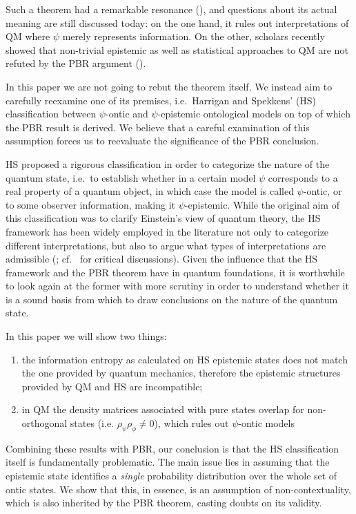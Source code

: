 \documentclass[twocolumn,prl,floatfix,superscriptaddress]{revtex4-2}
\begin{document}
Such a theorem had a remarkable resonance (\cite{Leifer:2014, Leifer:2014b, Renner:2012, Colbeck:2017, Hardy:2013, Maroney:2014, Patra:2013, Mansfield:2016, Schlosshauer:2012, Schlosshauer:2013, Schlosshauer:2014, Aaronson:2013}), and questions about its actual meaning are still discussed today: on the one hand, it rules out interpretations of QM where $\psi$ merely represents information. On the other, scholars recently showed that non-trivial epistemic as well as statistical approaches to QM are not refuted by the PBR argument (\cite{Ben:2017, Rizzi:2018, Oldofredi:2021, DeBrota:2019}).
	
In this paper we are not going to rebut the theorem itself. We instead aim to carefully reexamine one of its premises, i.e.\ Harrigan and Spekkens' (HS) classification between $\psi$-ontic and $\psi$-epistemic ontological models  \cite{Harrigan:2010} on top of which the PBR result is derived. We believe that a careful examination of this assumption forces us to reevaluate the significance of the PBR conclusion. 
		
HS proposed a rigorous classification in order to categorize the nature of the quantum state, i.e.\ to establish whether in a certain model $\psi$ corresponds to a real property of a quantum object, in which case the model is called $\psi$-ontic, or to some observer information, making it $\psi$-epistemic. While the original aim of this classification was to clarify Einstein's view of quantum theory, the HS framework has been widely employed in the literature not only to categorize different interpretations, but also to argue what types of interpretations are admissible (\cite{Leifer:2013, Leifer:2017, Branciard:2014, Hermens:2021, Wood:2015, Ringbauer:2015, Mazurek:2016, Bartlett:2012}; cf.\ \cite{Oldofredi:2020b, Lewis:2012, Ladyman:2021} for critical discussions). Given the influence that the HS framework and the PBR theorem have in quantum foundations, it is worthwhile to look again at the former with more scrutiny in order to understand whether it is a sound basis from which to draw conclusions on the nature of the quantum state.

In this paper we will show two things:
\begin{enumerate}
	\item the information entropy as calculated on HS epistemic states does not match the one provided by quantum mechanics, therefore the epistemic structures provided by QM and HS are incompatible;
	\item in QM the density matrices associated with pure states overlap for non-orthogonal states (i.e. $\rho_\psi \rho_\phi \neq 0$), which rules out $\psi$-ontic models
\end{enumerate}
Combining these results with PBR, our conclusion is that the HS classification itself is fundamentally problematic. The main issue lies in assuming that the epistemic state identifies a \emph{single} probability distribution over the whole set of ontic states. We show that this, in essence, is an assumption of non-contextuality, which is also inherited by the PBR theorem, casting doubts on its validity.
\end{document}
